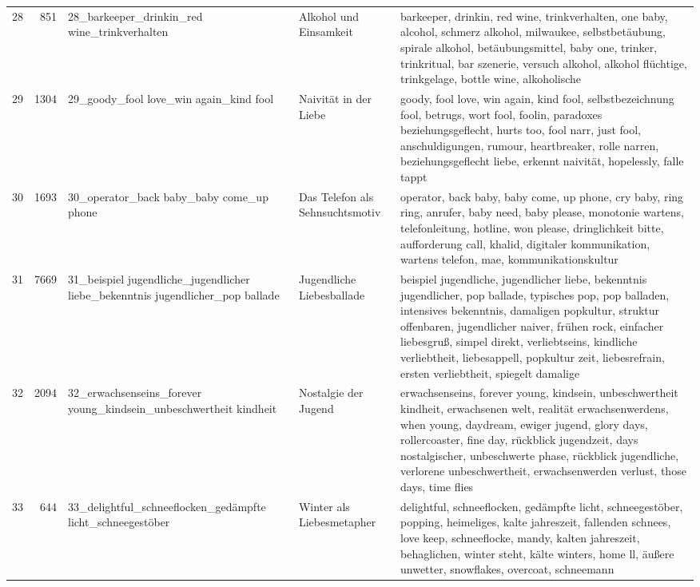 \begin{longtable}{rrlll}
28 & 851 & 28\_barkeeper\_drinkin\_red wine\_trinkverhalten & Alkohol und Einsamkeit & barkeeper, drinkin, red wine, trinkverhalten, one baby, alcohol, schmerz alkohol, milwaukee, selbstbetäubung, spirale alkohol, betäubungsmittel, baby one, trinker, trinkritual, bar szenerie, versuch alkohol, alkohol flüchtige, trinkgelage, bottle wine, alkoholische \\
29 & 1304 & 29\_goody\_fool love\_win again\_kind fool & Naivität in der Liebe & goody, fool love, win again, kind fool, selbstbezeichnung fool, betrugs, wort fool, foolin, paradoxes beziehungsgeflecht, hurts too, fool narr, just fool, anschuldigungen, rumour, heartbreaker, rolle narren, beziehungsgeflecht liebe, erkennt naivität, hopelessly, falle tappt \\
30 & 1693 & 30\_operator\_back baby\_baby come\_up phone & Das Telefon als Sehnsuchtsmotiv & operator, back baby, baby come, up phone, cry baby, ring ring, anrufer, baby need, baby please, monotonie wartens, telefonleitung, hotline, won please, dringlichkeit bitte, aufforderung call, khalid, digitaler kommunikation, wartens telefon, mae, kommunikationskultur \\
31 & 7669 & 31\_beispiel jugendliche\_jugendlicher liebe\_bekenntnis jugendlicher\_pop ballade & Jugendliche Liebesballade & beispiel jugendliche, jugendlicher liebe, bekenntnis jugendlicher, pop ballade, typisches pop, pop balladen, intensives bekenntnis, damaligen popkultur, struktur offenbaren, jugendlicher naiver, frühen rock, einfacher liebesgruß, simpel direkt, verliebtseins, kindliche verliebtheit, liebesappell, popkultur zeit, liebesrefrain, ersten verliebtheit, spiegelt damalige \\
32 & 2094 & 32\_erwachsenseins\_forever young\_kindsein\_unbeschwertheit kindheit & Nostalgie der Jugend & erwachsenseins, forever young, kindsein, unbeschwertheit kindheit, erwachsenen welt, realität erwachsenwerdens, when young, daydream, ewiger jugend, glory days, rollercoaster, fine day, rückblick jugendzeit, days nostalgischer, unbeschwerte phase, rückblick jugendliche, verlorene unbeschwertheit, erwachsenwerden verlust, those days, time flies \\
33 & 644 & 33\_delightful\_schneeflocken\_gedämpfte licht\_schneegestöber & Winter als Liebesmetapher & delightful, schneeflocken, gedämpfte licht, schneegestöber, popping, heimeliges, kalte jahreszeit, fallenden schnees, love keep, schneeflocke, mandy, kalten jahreszeit, behaglichen, winter steht, kälte winters, home ll, äußere unwetter, snowflakes, overcoat, schneemann \\

\end{longtable}
